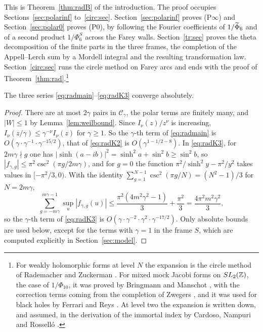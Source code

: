 This is Theorem~\ref{thm:radB} of the introduction. The proof occupies Sections~\ref{sec:polarinf} to~\ref{circ:sec}. Section~\ref{sec:polarinf} proves (P$\infty$) and Section~\ref{sec:polar0} proves (P0), by following the Fourier coefficients of $1/\widetilde\Phi_6$ and of a second product $1/\Phi^S_6$ across the Farey walls. Section~\ref{tr:sec} proves the theta decomposition of the finite parts in the three frames, the completion of the Appell--Lerch sum by a Mordell integral and the resulting transformation law. Section~\ref{circ:sec} runs the circle method on Farey arcs and ends with the proof of Theorem~\ref{thm:rad}.\footnote{For weakly holomorphic forms at level $N$ the expansion is the circle method of Rademacher and Zuckerman \cite{RZ38,Zuc39}. For mixed mock Jacobi forms on $SL_2(\mathbb{Z})$, the case of $1/\Phi_{10}$, it was proved by Bringmann and Manschot \cite{BMa13}, with the correction terms coming from the completion of Zwegers \cite{Zwe02}, and it was used for black holes by Ferrari and Reys \cite{FR17}. At level two the expansion is written down, and assumed, in the derivation of the immortal index by Cardoso, Nampuri and Rossell\'o \cite[\S4]{CNR21}.}

\begin{lemma}\label{lem:radconv}
The three series \eqref{eq:radmain}--\eqref{eq:radK3} converge absolutely.
\end{lemma}

\begin{proof}
There are at most $2\gamma$ pairs in $\mathcal C_\gamma$, the polar terms are finitely many, and $|W|\le1$ by Lemma~\ref{lem:weilbound}. Since $I_\nu(z)/z^\nu$ is increasing, $I_\nu(z/\gamma)\le\gamma^{-\nu}I_\nu(z)$ for $\gamma\ge1$. So the $\gamma$-th term of \eqref{eq:radmain} is $O(\gamma\cdot\gamma^{-1}\cdot\gamma^{-15/2})$, that of \eqref{eq:radK2} is $O(\gamma^{1-1/2-8})$. In \eqref{eq:radK3}, for $2m\gamma\nmid g$ one has $|\sinh(a-ib)|^2=\sinh^2a+\sin^2b\ge\sin^2b$, so $|f_{\gamma,g}|\le\pi^2\csc^2(\pi g/2m\gamma)$, and for $g=0$ the function $\pi^2/\sinh^2y-\pi^2/y^2$ takes values in $[-\pi^2/3,0)$. With the identity $\sum_{g=1}^{N-1}\csc^2(\pi g/N)=(N^2-1)/3$ for $N=2m\gamma$,
\begin{equation}\label{eq:fsum}
\sum_{g=-m\gamma}^{m\gamma-1}\sup_u|f_{\gamma,g}(u)|\le\frac{\pi^2(4m^2\gamma^2-1)}3+\frac{\pi^2}3=\frac{4\pi^2m^2\gamma^2}3,
\end{equation}
so the $\gamma$-th term of \eqref{eq:radK3} is $O(\gamma\cdot\gamma^{-2}\cdot\gamma^2\cdot\gamma^{-17/2})$. Only absolute bounds are used below, except for the terms with $\gamma=1$ in the frame $S$, which are computed explicitly in Section~\ref{sec:model}.
\end{proof}

